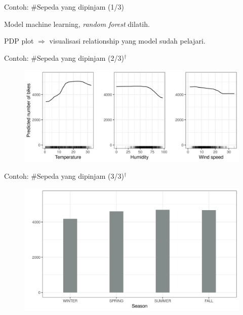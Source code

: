 \documentclass[aspectratio=169]{beamer}
\begin{document}
\begin{frame}{Contoh: \#Sepeda yang dipinjam (1/3)}
	\begin{vfilleditems}
		\item Model machine learning, \textit{random forest} dilatih.
		\item PDP plot $\Rightarrow$ visualisasi relationship yang model sudah pelajari.
	\end{vfilleditems}
\end{frame}

\begin{frame}{Contoh: \#Sepeda yang dipinjam (2/3)$^\dagger$}
	\begin{figure}[!ht]
		\centering
		\includegraphics[scale=.75]{images/pdp-bike-1}
	\end{figure}
\end{frame}

\begin{frame}{Contoh: \#Sepeda yang dipinjam (3/3)$^\dagger$}
	\begin{figure}[!ht]
		\centering
		\includegraphics[scale=.6]{images/pdp-bike-cat-1}
	\end{figure}
\end{frame}
\end{document}
